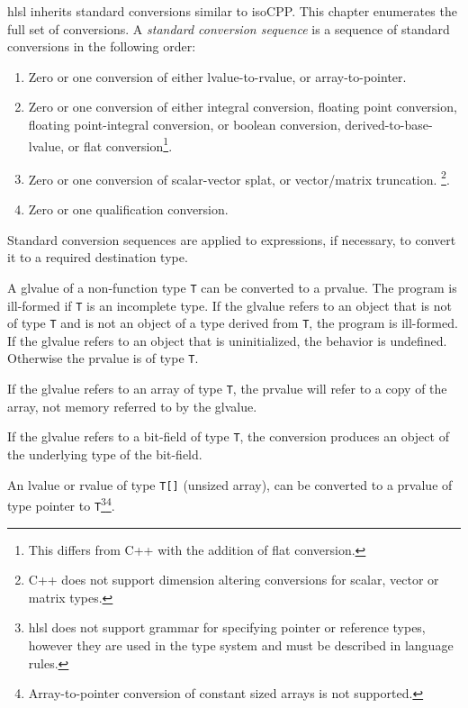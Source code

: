 
\p \acrshort{hlsl} inherits standard conversions similar to \gls{isoCPP}. This
chapter enumerates the full set of conversions. A \textit{standard conversion
sequence} is a sequence of standard conversions in the following
order:
\begin{enumerate}
  \item Zero or one conversion of either lvalue-to-rvalue, or array-to-pointer.
  \item Zero or one conversion of either integral conversion, floating point
  conversion, floating point-integral conversion, or boolean conversion,
  derived-to-base-lvalue, or flat conversion\footnote{This differs from C++ with
  the addition of flat conversion.}.
  \item Zero or one conversion of scalar-vector splat, or vector/matrix
  truncation. \footnote{C++ does not support dimension altering conversions for
  scalar, vector or matrix types.}.
  \item Zero or one qualification conversion.
\end{enumerate}

Standard conversion sequences are applied to expressions, if necessary, to
convert it to a required destination type.


\p A glvalue of a non-function type \texttt{T} can be converted to a prvalue.
The program is ill-formed if \texttt{T} is an incomplete type. If the glvalue
refers to an object that is not of type \texttt{T} and is not an object of a
type derived from \texttt{T}, the program is ill-formed. If the glvalue refers to
an object that is uninitialized, the behavior is undefined. Otherwise the
prvalue is of type \texttt{T}.

\p If the glvalue refers to an array of type \texttt{T}, the prvalue will refer
to a copy of the array, not memory referred to by the glvalue.

\p If the glvalue refers to a bit-field of type \texttt{T}, the conversion
produces an object of the underlying type of the bit-field.


\p An lvalue or rvalue of type \texttt{T[]} (unsized array), can be converted to
a prvalue of type pointer to \texttt{T}\footnote{\acrshort{hlsl} does not
support grammar for specifying pointer or reference types, however they are used
in the type system and must be described in language
rules.}\footnote{Array-to-pointer conversion of constant sized arrays is not
supported.}.


